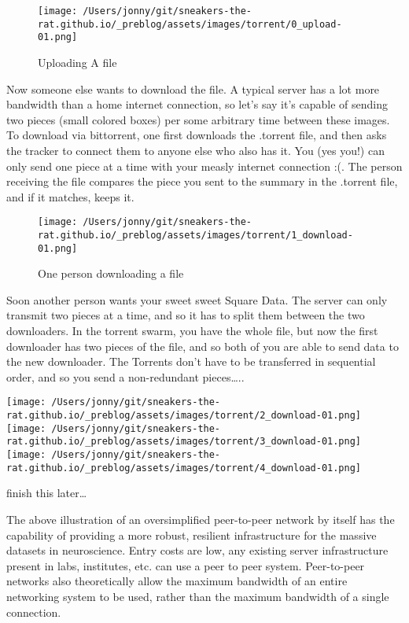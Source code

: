 \documentclass[nohyper]{tufte-book-jls}
\begin{document}
\begin{figure}
\centering
\texttt{[image: /Users/jonny/git/sneakers-the-rat.github.io/\_preblog/assets/images/torrent/0\_upload-01.png]}
\caption{Uploading A file}
\end{figure}

Now someone else wants to download the file. A typical server has a lot
more bandwidth than a home internet connection, so let's say it's
capable of sending two pieces (small colored boxes) per some arbitrary
time between these images. To download via bittorrent, one first
downloads the .torrent file, and then asks the tracker to connect them
to anyone else who also has it. You (yes you!) can only send one piece
at a time with your measly internet connection :(. The person receiving
the file compares the piece you sent to the summary in the .torrent
file, and if it matches, keeps it.

\begin{figure}
\centering
\texttt{[image: /Users/jonny/git/sneakers-the-rat.github.io/\_preblog/assets/images/torrent/1\_download-01.png]}
\caption{One person downloading a file}
\end{figure}

Soon another person wants your sweet sweet Square Data. The server can
only transmit two pieces at a time, and so it has to split them between
the two downloaders. In the torrent swarm, you have the whole file, but
now the first downloader has two pieces of the file, and so both of you
are able to send data to the new downloader. The Torrents don't have to
be transferred in sequential order, and so you send a non-redundant
pieces\ldots..

\texttt{[image: /Users/jonny/git/sneakers-the-rat.github.io/\_preblog/assets/images/torrent/2\_download-01.png]}
\texttt{[image: /Users/jonny/git/sneakers-the-rat.github.io/\_preblog/assets/images/torrent/3\_download-01.png]}
\texttt{[image: /Users/jonny/git/sneakers-the-rat.github.io/\_preblog/assets/images/torrent/4\_download-01.png]}

finish this later\ldots{}

The above illustration of an oversimplified peer-to-peer network by
itself has the capability of providing a more robust, resilient
infrastructure for the massive datasets in neuroscience. Entry costs are
low, any existing server infrastructure present in labs, institutes,
etc. can use a peer to peer system. Peer-to-peer networks also
theoretically allow the maximum bandwidth of an entire networking system
to be used, rather than the maximum bandwidth of a single connection.
\end{document}
